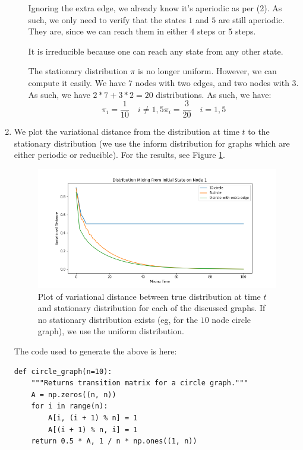 \documentclass[12pt]{article}
\begin{document}
\begin{enumerate}[label=(\alph*)]
\begin{enumerate}
      Ignoring the extra edge, we already know it's aperiodic as per (2). As such, we only need to verify that the states $1$ and $5$ are still aperiodic. They are, since we can reach them in either $4$ steps or $5$ steps.   

      It is irreducible because one can reach any state from any other state.

      The stationary distribution $\pi$ is no longer uniform. However, we can compute it easily. We have $7$ nodes with two edges, and two nodes with $3$. As such, we have $2*7 + 3*2 = 20$ distributions. As such, we have:
      \[
        \pi_i = \frac{1}{10} \quad i \neq 1,5
        \pi_i = \frac{3}{20} \quad i = 1, 5
      \]
    \end{enumerate}
  \item We plot the variational distance from the distribution at time $t$ to the stationary distribution (we use the inform distribution for graphs which are either periodic or reducible). For the results, see Figure \ref{fig:mixing_time}.

  \begin{figure}[!ht]
    \centering
    \includegraphics[scale=0.5]{figures/mixing_time.png}
    \caption{Plot of variational distance between true distribution at time $t$ and stationary distribution for each of the discussed graphs. If no stationary distribution exists (eg, for the $10$ node circle graph), we use the uniform distribution.}
    \label{fig:mixing_time}
  \end{figure}

  The code used to generate the above is here:
  \begin{verbatim}
def circle_graph(n=10):
    """Returns transition matrix for a circle graph."""
    A = np.zeros((n, n))
    for i in range(n):
        A[i, (i + 1) % n] = 1
        A[(i + 1) % n, i] = 1
    return 0.5 * A, 1 / n * np.ones((1, n))


\end{verbatim}
\end{enumerate}
\end{document}
